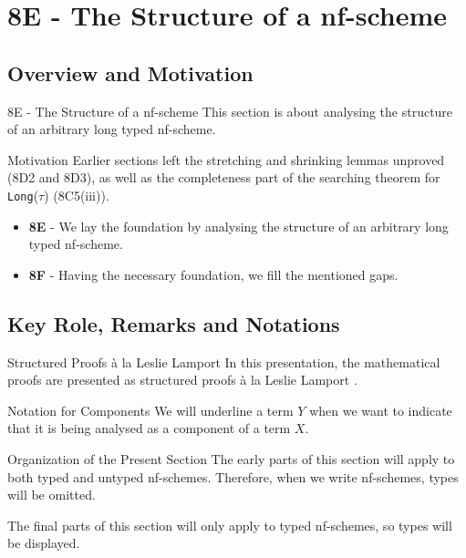 \section{8E - The Structure of a nf-scheme}

\subsection{Overview and Motivation}
\begin{frame}{8E - The Structure of a nf-scheme}
    This section is about analysing the structure of an arbitrary long typed nf-scheme. 
\end{frame}

\begin{frame}{Motivation}
    Earlier sections left the stretching and shrinking lemmas unproved (8D2 and 8D3), 
    as well as the completeness part of the searching theorem for \texttt{Long}($\tau$) (8C5(iii)). 
    
    \medskip
    
    \begin{itemize}
        \item \textbf{8E} - We lay the foundation by analysing the structure of an arbitrary long
        typed nf-scheme. 
        \item \textbf{8F} - Having the necessary foundation, we fill the mentioned gaps. 
    \end{itemize}
\end{frame}

\subsection{Key Role, Remarks and Notations}
\begin{frame}{Structured Proofs à la Leslie Lamport}
    In this presentation, the mathematical proofs are presented as structured proofs à la Leslie Lamport \cite{lamport1, lamport2}.
\end{frame}

\begin{frame}{Notation for Components}
We will underline a term $Y$ when we want to indicate that it is being analysed as a component of a term $X$.
\end{frame}

\begin{frame}{Organization of the Present Section}
The early parts of this section will apply to both typed and untyped nf-schemes. Therefore, when we write nf-schemes, types will be omitted. 

\medskip

The final parts of this section will only apply to typed nf-schemes, so types will be displayed. 
\end{frame}

